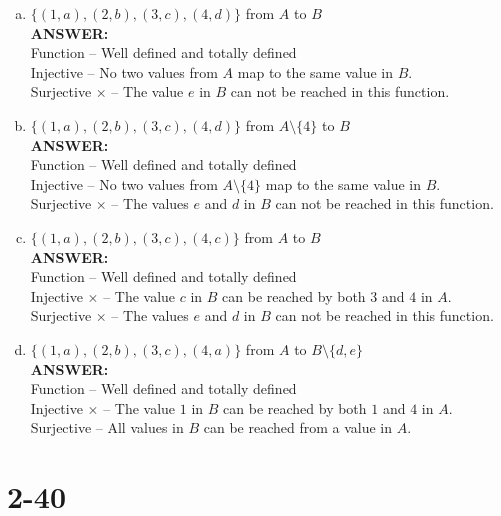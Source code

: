\documentclass{article}
\begin{document}
\begin{enumerate}[a)]
    \item $\{(1, a), (2, b), (3, c), (4, d)\}$ from $A$ to $B$ \\
        \textbf{ANSWER:} \\
        Function -- Well defined and totally defined \\
        Injective \checkmark -- No two values from $A$ map to the same value in
        $B$. \\
        Surjective $\times$ -- The value $e$ in $B$ can not be reached in this
        function.
    \item $\{(1, a), (2, b), (3, c), (4, d)\}$ from $A \setminus \{4\}$ to $B$ \\
        \textbf{ANSWER:} \\
        Function -- Well defined and totally defined \\
        Injective \checkmark -- No two values from $A \setminus \{4\}$ map to the same value in
        $B$. \\
        Surjective $\times$ -- The values $e$ and $d$ in $B$ can not be reached in this
        function.
    \item $\{(1, a), (2, b), (3, c), (4, c)\}$ from $A$ to $B$ \\
        \textbf{ANSWER:} \\
        Function -- Well defined and totally defined \\
        Injective $\times$ -- The value $c$ in $B$ can be reached by both $3$
        and $4$ in $A$. \\
        Surjective $\times$ -- The values $e$ and $d$ in $B$ can not be reached in this
        function.
    \item $\{(1, a), (2, b), (3, c), (4, a)\}$ from $A$ to $B \setminus \{d, e\}$ \\
        \textbf{ANSWER:} \\
        Function -- Well defined and totally defined \\
        Injective $\times$ -- The value $1$ in $B$ can be reached by both $1$
        and $4$ in $A$. \\
        Surjective \checkmark -- All values in $B$ can be reached from a value
        in $A$.
\end{enumerate}

\section{2-40}
\end{document}

